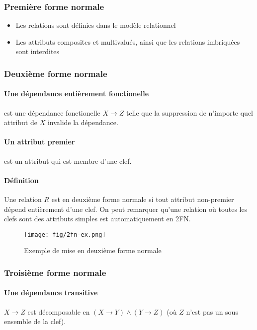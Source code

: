 \documentclass[a4paper]{article}
\begin{document}
\subsubsection{Première forme normale}
\begin{itemize}
  \item Les relations sont définies dans le modèle relationnel
  \item Les attributs composites et multivalués, ainsi que les relations imbriquées
        sont interdites
\end{itemize}

\subsubsection{Deuxième forme normale}
\paragraph{Une dépendance entièrement fonctionelle} est une dépendance fonctionelle
$X \rightarrow Z$ telle que la suppression de n'importe quel attribut de $X$ invalide
la dépendance.
\paragraph{Un attribut premier} est un attribut qui est membre d'une clef.
\paragraph{Définition} Une relation $R$ est en deuxième forme normale si tout
attribut non-premier dépend entièrement d'une clef. On peut remarquer qu'une relation
où toutes les clefs sont des attributs simples est automatiquement en 2FN.

\begin{figure}[H]
\center
\texttt{[image: fig/2fn-ex.png]}
\caption{Exemple de mise en deuxième forme normale}
\end{figure}

\subsubsection{Troisième forme normale}
\paragraph{Une dépendance transitive} $X \rightarrow Z$ est décomposable en
$(X \rightarrow Y) \land (Y \rightarrow Z)$ (où $Z$ n'est pas un sous ensemble de la clef).
\end{document}
